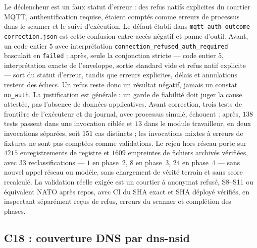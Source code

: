 \documentclass[11pt,a4paper]{article}
\newcommand{\code}[1]{{\urlstyle{tt}\nolinkurl{#1}}}
\begin{document}
Le déclencheur est un faux statut d'erreur : des refus natifs explicites du courtier MQTT, authentification requise, étaient comptés comme erreurs de processus dans le scanner et le suivi d'exécution. Le défaut établi dans \code{mqtt-auth-outcome-correction.json} est cette confusion entre accès négatif et panne d'outil. Avant, un code entier $5$ avec interprétation \code{connection_refused_auth_required} basculait en \code{failed} ; après, seule la conjonction stricte --- code entier $5$, interprétation exacte de l'enveloppe, sortie standard vide et refus natif explicite --- sort du statut d'erreur, tandis que erreurs explicites, délais et annulations restent des échecs. Un refus reste donc un résultat négatif, jamais un constat \code{no_auth}. La justification est générale : un garde de fiabilité doit juger la cause attestée, pas l'absence de données applicatives. Avant correction, trois tests de frontière de l'exécuteur et du journal, avec processus simulé, échouent ; après, $138$ tests passent dans une invocation ciblée et $13$ dans le module travailleur, en deux invocations séparées, soit 151 cas distincts ; les invocations mixtes à erreurs de fixtures ne sont pas comptées comme validations. Le rejeu hors réseau porte sur $4215$ enregistrements de registre et $1609$ empreintes de fichiers archivés vérifiées, avec $33$ reclassifications --- $1$ en phase~2, $8$ en phase~3, $24$ en phase~4 --- sans nouvel appel réseau ou modèle, sans chargement de vérité terrain et sans score recalculé. La validation réelle exigée est un courtier à anonymat refusé, S8--S11 ou équivalent NATO après repos, avec CI du SHA exact et SHA déployé vérifiés, en inspectant séparément reçus de refus, erreurs du scanner et complétion des phases.

\subsection{C18 : couverture DNS par dns-nsid}
\label{sec:c18}
\end{document}
